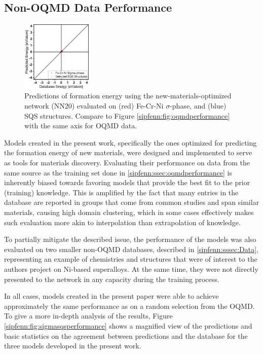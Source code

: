 \subsection{Non-OQMD Data Performance} \label{sipfenn:ssec:sigmasqsperformance}

\begin{figure}[H]
    \centering
    \includegraphics[width=0.3\textwidth]{sipfenn/NN20_test_sigmasqs.png}
    \caption{Predictions of formation energy using the new-materials-optimized network (NN20) evaluated on (red) Fe-Cr-Ni $\sigma$-phase, and (blue) SQS structures. Compare to Figure \ref{sipfenn:fig:oqmdperformance} with the same axis for OQMD data.}
    \label{sipfenn:fig:sqssigmabroad}
    \vspace{-12pt}
\end{figure}

Models created in the present work, specifically the ones optimized for predicting the formation energy of new materials, were designed and implemented to serve as tools for materials discovery. Evaluating their performance on data from the same source as the training set done in \ref{sipfenn:ssec:oqmdperformance} is inherently biased towards favoring models that provide the best fit to the prior (training) knowledge. This is amplified by the fact that many entries in the database are reported in groups that come from common studies and span similar materials, causing high domain clustering, which in some cases effectively makes such evaluation more akin to interpolation than extrapolation of knowledge.

To partially mitigate the described issue, the performance of the models was also evaluated on two smaller non-OQMD databases, described in \ref{sipfenn:sssec:Data}, representing an example of chemistries and structures that were of interest to the authors project on Ni-based superalloys. At the same time, they were not directly presented to the network in any capacity during the training process.

In all cases, models created in the present paper were able to achieve approximately the same performance as on a random selection from the OQMD. To give a more in-depth analysis of the results, Figure \ref{sipfenn:fig:sigmasqsperformance} shows a magnified view of the predictions and basic statistics on the agreement between predictions and the database for the three models developed in the present work.

